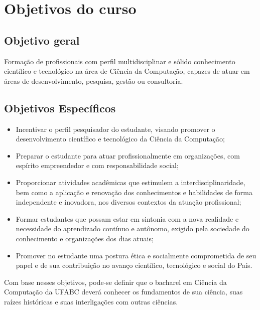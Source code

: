 \section{Objetivos do curso}

\subsection{Objetivo geral}

Formação de profissionais com perfil multidisciplinar e sólido conhecimento científico e tecnológico na
área de Ciência da Computação, capazes de atuar em áreas de desenvolvimento, pesquisa,
gestão ou consultoria.

\subsection{Objetivos Específicos}

\begin{itemize}
    \item Incentivar o perfil pesquisador do estudante, visando promover o
    desenvolvimento científico e tecnológico da Ciência da Computação;

    \item Preparar o estudante para atuar profissionalmente em organizações,
    com espírito empreendedor e com responsabilidade social;

    \item Proporcionar atividades acadêmicas que estimulem a
    interdisciplinaridade, bem como a aplicação e renovação dos conhecimentos e
    habilidades de forma independente e inovadora, nos diversos contextos da
    atuação profissional;

    \item Formar estudantes que possam estar em sintonia com a nova realidade e
    necessidade do aprendizado contínuo e autônomo, exigido pela sociedade do
    conhecimento e organizações dos dias atuais;

    \item Promover no estudante uma postura ética e socialmente comprometida de
    seu papel e de sua contribuição no avanço científico, tecnológico e social
    do País.
\end{itemize}

Com base nesses objetivos, pode-se definir que o bacharel em Ciência da
Computação da UFABC deverá conhecer os fundamentos de sua ciência, suas raízes
históricas e suas interligações com outras ciências.

